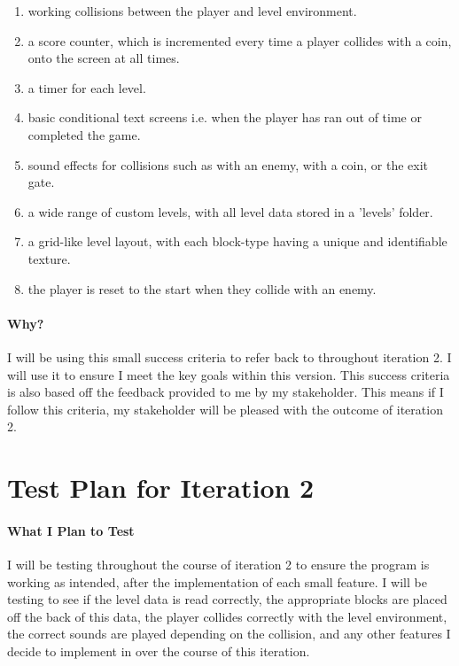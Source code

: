 \documentclass[12pt]{report}
\begin{document}
\begin{enumerate}
    \item working collisions between the player and level environment.
    \item a score counter, which is incremented every time a player collides with a coin, onto the screen at all times.
    \item a timer for each level.
    \item basic conditional text screens i.e. when the player has ran out of time or completed the game.
    \item sound effects for collisions such as with an enemy, with a coin, or the exit gate.
    \item a wide range of custom levels, with all level data stored in a 'levels' folder.
    \item a grid-like level layout, with each block-type having a unique and identifiable texture.
    \item the player is reset to the start when they collide with an enemy.
\end{enumerate}

\paragraph{Why?} I will be using this small success criteria to refer back to throughout iteration 2. I will use it to ensure I meet the key goals within this version. This success criteria is also based off the feedback provided to me by my stakeholder. This means if I follow this criteria, my stakeholder will be pleased with the outcome of iteration 2.

\pagebreak

\section{Test Plan for Iteration 2}

\paragraph{What I Plan to Test}I will be testing throughout the course of iteration 2 to ensure the program is working as intended, after the implementation of each small feature. I will be testing to see if the level data is read correctly, the appropriate blocks are placed off the back of this data, the player collides correctly with the level environment, the correct sounds are played depending on the collision, and any other features I decide to implement in over the course of this iteration. 
\end{document}
